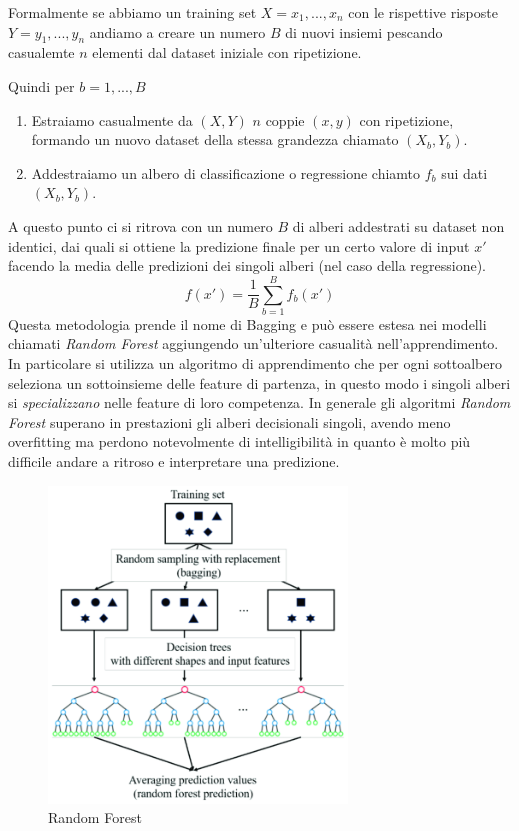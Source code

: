 \documentclass[12pt,a4paper,openright,twoside]{report}
\begin{document}
Formalmente se abbiamo un training set $X = x_{1}, ... , x_{n}$ con le rispettive risposte $Y = y_{1}, ... , y_{n}$ andiamo a creare un numero $B$ di nuovi insiemi pescando casualemte $n$ elementi dal dataset iniziale con ripetizione.

Quindi per $b = 1, ..., B$
\begin{enumerate}
    \item Estraiamo casualmente da $(X,Y)$ $n$ coppie $(x,y)$ con ripetizione, formando un nuovo dataset della stessa grandezza chiamato $(X_{b}, Y_{b})$. 
    \item Addestraiamo un albero di classificazione o regressione chiamto $f_{b}$ sui dati $(X_{b}, Y_{b})$.
\end{enumerate}

A questo punto ci si ritrova con un numero $B$ di alberi addestrati su dataset non identici, dai quali si ottiene la predizione finale per un certo valore di input $x'$ facendo la media delle predizioni dei singoli alberi (nel caso della regressione).
\begin{equation}
    f(x') = \frac{1}{B}\sum_{b=1}^{B} f_{b}(x')
\end{equation}
Questa metodologia prende il nome di Bagging e può essere estesa nei modelli chiamati \emph{Random Forest} aggiungendo un'ulteriore casualità nell'apprendimento. In particolare si utilizza un algoritmo di apprendimento che per ogni sottoalbero seleziona un sottoinsieme delle feature di partenza, in questo modo i singoli alberi si \emph{specializzano} nelle feature di loro competenza.
In generale gli algoritmi \emph{Random Forest} superano in prestazioni gli alberi decisionali singoli, avendo meno overfitting ma perdono notevolmente di intelligibilità in quanto è molto più difficile andare a ritroso e interpretare una predizione. 
\begin{center}
\begin{figure}[h]
\centering
\includegraphics[width=300px,keepaspectratio]{random forest.png}
\caption{Random Forest}
\end{figure}    
\end{center}
\end{document}
